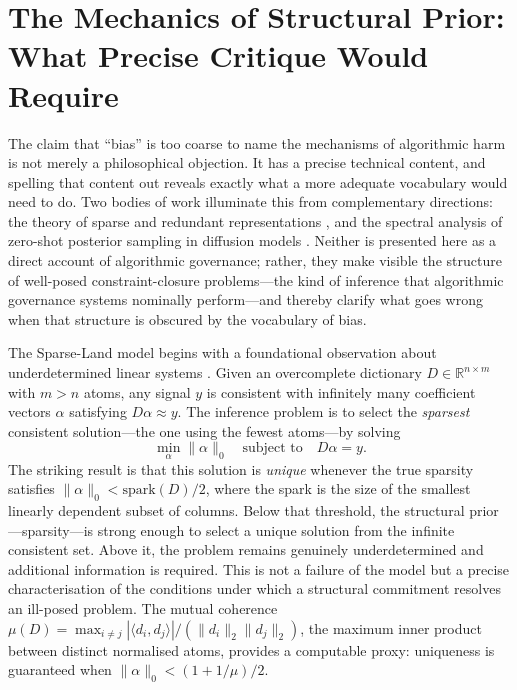 \documentclass[12pt, a4paper]{article}
\begin{document}
\section{The Mechanics of Structural Prior: What Precise Critique Would Require}

The claim that \enquote{bias} is too coarse to name the mechanisms of algorithmic harm is not merely a philosophical objection. It has a precise technical content, and spelling that content out reveals exactly what a more adequate vocabulary would need to do. Two bodies of work illuminate this from complementary directions: the theory of sparse and redundant representations \citep{elad2010}, and the spectral analysis of zero-shot posterior sampling in diffusion models \citep{benita2026}. Neither is presented here as a direct account of algorithmic governance; rather, they make visible the structure of well-posed constraint-closure problems---the kind of inference that algorithmic governance systems nominally perform---and thereby clarify what goes wrong when that structure is obscured by the vocabulary of bias.

The Sparse-Land model begins with a foundational observation about underdetermined linear systems \citep{elad2010}. Given an overcomplete dictionary $D \in \mathbb{R}^{n \times m}$ with $m > n$ atoms, any signal $y$ is consistent with infinitely many coefficient vectors $\alpha$ satisfying $D\alpha \approx y$. The inference problem is to select the \emph{sparsest} consistent solution---the one using the fewest atoms---by solving
\[
\min_{\alpha} \|\alpha\|_0 \quad \text{subject to} \quad D\alpha = y.
\]
The striking result is that this solution is \emph{unique} whenever the true sparsity satisfies $\|\alpha\|_0 < \mathrm{spark}(D)/2$, where the spark is the size of the smallest linearly dependent subset of columns. Below that threshold, the structural prior---sparsity---is strong enough to select a unique solution from the infinite consistent set. Above it, the problem remains genuinely underdetermined and additional information is required. This is not a failure of the model but a precise characterisation of the conditions under which a structural commitment resolves an ill-posed problem. The mutual coherence $\mu(D) = \max_{i \neq j} |\langle d_i, d_j \rangle| / (\|d_i\|_2 \|d_j\|_2)$, the maximum inner product between distinct normalised atoms, provides a computable proxy: uniqueness is guaranteed when $\|\alpha\|_0 < (1 + 1/\mu)/2$.
\end{document}
